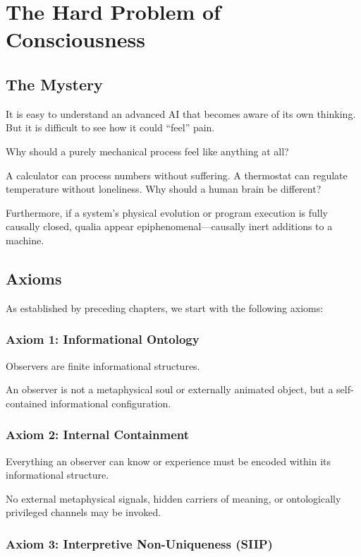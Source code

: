 \chapter{The Hard Problem of Consciousness}
\label{chap:the-hard-problem}

\section{The Mystery}

It is easy to understand an advanced AI that becomes aware of its own thinking. But it is difficult to see how it could ``feel'' pain. 

Why should a purely mechanical process feel like anything at all?

A calculator can process numbers without suffering. A thermostat can regulate temperature without loneliness. Why should a human brain be different?

Furthermore, if a system's physical evolution or program execution is fully causally closed,
qualia appear epiphenomenal—causally inert additions to a machine.


\section{Axioms}

As established by preceding chapters, we start with the following axioms:

\subsection*{Axiom 1: Informational Ontology}

Observers are finite informational structures.

An observer is not a metaphysical soul or externally animated object,
but a self-contained informational configuration.


\subsection*{Axiom 2: Internal Containment}

Everything an observer can know or experience must be encoded within its informational structure.

No external metaphysical signals, hidden carriers of meaning, or ontologically privileged channels may be invoked.



\subsection*{Axiom 3: Interpretive Non-Uniqueness (SIIP)}

